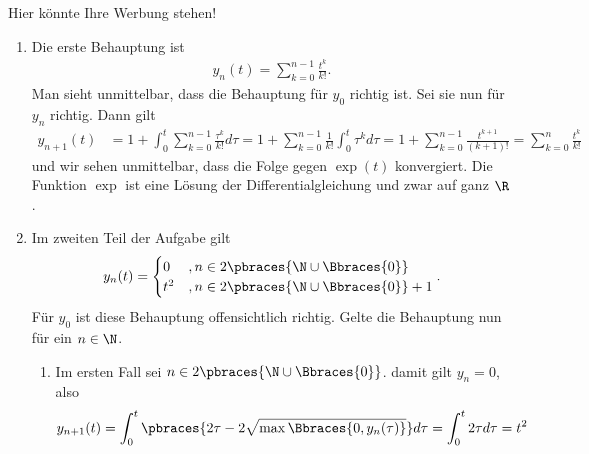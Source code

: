 \begin{solution}
    Hier könnte Ihre Werbung stehen!
    \begin{enumerate}[label = \alph*)]
        \item Die erste Behauptung ist
        \begin{align*}
        y_n(t) = \sum_{k = 0}^{n-1} \frac{t^k}{k!} .
        \end{align*}
        Man sieht unmittelbar, dass die Behauptung für $y_0$ richtig ist. Sei sie nun für $y_n$ richtig.
        Dann gilt
        \begin{align*}
            y_{n+1}(t) &= 1 + \int_0^t \sum_{k = 0}^{n-1} \frac{\tau^k}{k!} d\tau = 1 +  \sum_{k = 0}^{n-1}\frac{1}{k!} \int_0^t \tau^k d\tau = 1 + \sum_{k = 0}^{n-1} \frac{t^{k + 1}}{(k+1)!} = \sum_{k = 0}^n \frac{t^k}{k!}
        \end{align*}
        und wir sehen unmittelbar, dass die Folge gegen $\exp(t)$ konvergiert. Die Funktion $\exp$ ist eine Lösung der Differentialgleichung und zwar auf ganz $\R$.

        \item Im zweiten Teil der Aufgabe gilt
        \begin{align*}
            y_n(t) =
            \begin{cases}
                0 &, n \in 2 \pbraces{\N \cup \Bbraces{0}} \\
                t^2 &, n \in 2 \pbraces{\N \cup \Bbraces{0}} + 1
            \end{cases} .
        \end{align*}
        Für $y_0$ ist diese Behauptung offensichtlich richtig. Gelte die Behauptung nun für ein $n \in \N$.
        \begin{enumerate}[label = \roman*)]
            \item Im ersten Fall sei $n \in 2 \pbraces{\N \cup \Bbraces{0}}$. damit gilt $y_n = 0$, also
            \begin{align*}
                y_{n+1}(t) = \int_0^t \pbraces{2\tau - 2 \sqrt{\max\Bbraces{0, y_n(\tau)}}} d\tau = \int_0^t 2\tau d\tau = t^2
            \end{align*}


\end{enumerate}
\end{enumerate}
\end{solution}
